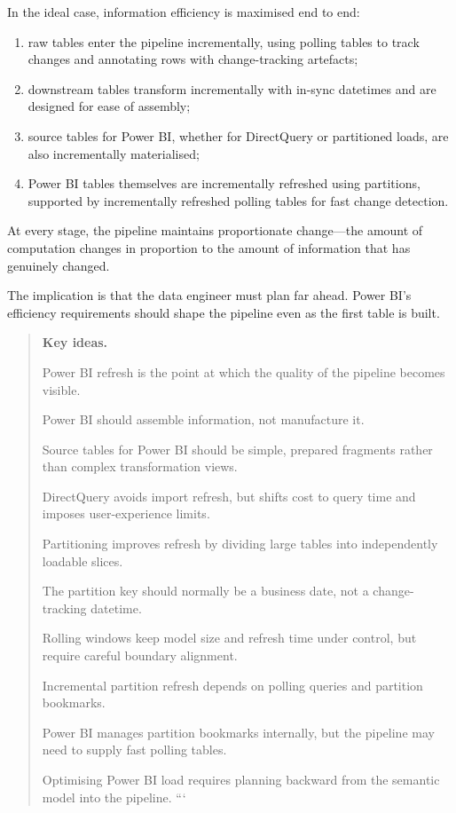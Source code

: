 \documentclass[10pt,openany,10pt]{book}
\providecommand{\tightlist}{%
  \setlength{\itemsep}{0pt}\setlength{\parskip}{0pt}}
\begin{document}
In the ideal case, information efficiency is maximised end to end:

\begin{enumerate}
\def\labelenumi{\arabic{enumi}.}
\tightlist
\item
  raw tables enter the pipeline incrementally, using polling tables to
  track changes and annotating rows with change-tracking artefacts;
\item
  downstream tables transform incrementally with in-sync datetimes and
  are designed for ease of assembly;
\item
  source tables for Power BI, whether for DirectQuery or partitioned
  loads, are also incrementally materialised;
\item
  Power BI tables themselves are incrementally refreshed using
  partitions, supported by incrementally refreshed polling tables for
  fast change detection.
\end{enumerate}

At every stage, the pipeline maintains proportionate change---the amount
of computation changes in proportion to the amount of information that
has genuinely changed.

The implication is that the data engineer must plan far ahead. Power
BI's efficiency requirements should shape the pipeline even as the first
table is built.

\begin{quote}
\textbf{Key ideas.}

Power BI refresh is the point at which the quality of the pipeline
becomes visible.

Power BI should assemble information, not manufacture it.

Source tables for Power BI should be simple, prepared fragments rather
than complex transformation views.

DirectQuery avoids import refresh, but shifts cost to query time and
imposes user-experience limits.

Partitioning improves refresh by dividing large tables into
independently loadable slices.

The partition key should normally be a business date, not a
change-tracking datetime.

Rolling windows keep model size and refresh time under control, but
require careful boundary alignment.

Incremental partition refresh depends on polling queries and partition
bookmarks.

Power BI manages partition bookmarks internally, but the pipeline may
need to supply fast polling tables.

Optimising Power BI load requires planning backward from the semantic
model into the pipeline. ```
\end{quote}
\end{document}
